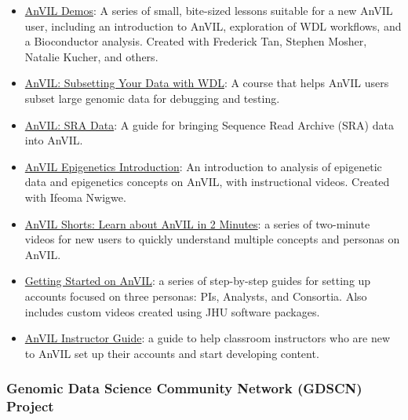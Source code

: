 \documentclass{cv}
\begin{document}
\begin{itemize}

\item \href{https://hutchdatascience.org/AnVIL_Demos/}{AnVIL Demos}: A series of small, bite-sized lessons suitable for a new AnVIL user, including an introduction to AnVIL, exploration of WDL workflows, and a Bioconductor analysis. Created with Frederick Tan, Stephen Mosher, Natalie Kucher, and others.

\item \href{https://hutchdatascience.org/AnVIL_Data_Subsetting}{AnVIL: Subsetting Your Data with WDL}: A course that helps AnVIL users subset large genomic data for debugging and testing.

\item \href{https://hutchdatascience.org/AnVIL_SRA_Data/}{AnVIL: SRA Data}: A guide for bringing Sequence Read Archive (SRA) data into AnVIL.

\item \href{https://hutchdatascience.org/AnVIL_Book_Epigenetics_Intro/}{AnVIL Epigenetics Introduction}: An introduction to analysis of epigenetic data and epigenetics concepts on AnVIL, with instructional videos. Created with Ifeoma Nwigwe.

\item \href{https://www.youtube.com/watch?v=tVh93e6TzCE\&list=PL6aYJ_0zJ4uCABkMngSYjPo_3c-nUUmio}{AnVIL Shorts: Learn about AnVIL in 2 Minutes}: a series of two-minute videos for new users to quickly understand multiple concepts and personas on AnVIL.

\item \href{https://jhudatascience.org/AnVIL_Book_Getting_Started/}{Getting Started on AnVIL}: a series of step-by-step guides for setting up accounts focused on three personas: PIs, Analysts, and Consortia. Also includes custom videos created using JHU software packages.

\item \href{https://jhudatascience.org/AnVIL_Book_Instructor_Guide/}{AnVIL Instructor Guide}: a guide to help classroom instructors who are new to AnVIL set up their accounts and start developing content.

\end{itemize}

\subsubsection*{Genomic Data Science Community Network (GDSCN) Project}
\end{document}
